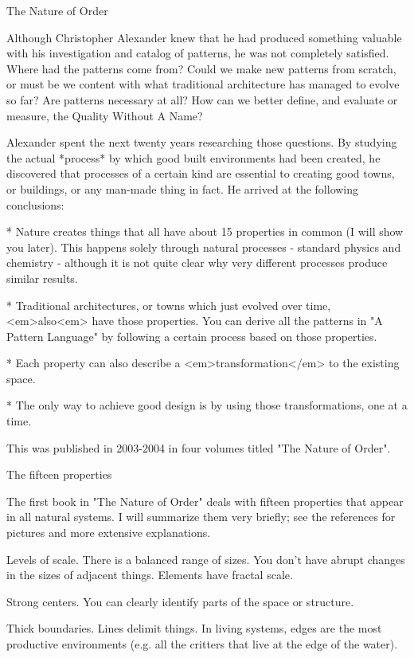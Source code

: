 The Nature of Order

Although Christopher Alexander knew that he had produced something valuable with his investigation and catalog of patterns, he was not completely satisfied.  Where had the patterns come from?  Could we make new patterns from scratch, or must be we content with what traditional architecture has managed to evolve so far?  Are patterns necessary at all?  How can we better define, and evaluate or measure, the Quality Without A Name?

Alexander spent the next twenty years researching those questions.  By studying the actual *process* by which good built environments had been created, he discovered that processes of a certain kind are essential to creating good towns, or buildings, or any man-made thing in fact.  He arrived at the following conclusions:

* Nature creates things that all have about 15 properties in common (I will show you later).  This happens solely through natural processes - standard physics and chemistry - although it is not quite clear why very different processes produce similar results.

* Traditional architectures, or towns which just evolved over time, <em>also<em> have those properties.  You can derive all the patterns in "A Pattern Language" by following a certain process based on those properties.

* Each property can also describe a <em>transformation</em> to the existing space.

* The only way to achieve good design is by using those transformations, one at a time.

This was published in 2003-2004 in four volumes titled "The Nature of Order".

The fifteen properties

The first book in "The Nature of Order" deals with fifteen properties that appear in all natural systems.  I will summarize them very briefly; see the references for pictures and more extensive explanations.

Levels of scale.  There is a balanced range of sizes.  You don't have abrupt changes in the sizes of adjacent things.  Elements have fractal scale.

Strong centers.  You can clearly identify parts of the space or structure.

Thick boundaries.  Lines delimit things.  In living systems, edges are the most productive environments (e.g. all the critters that live at the edge of the water).

